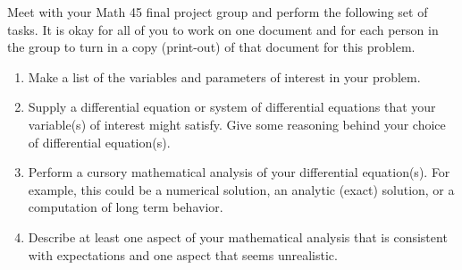 \documentclass[12pt,letterpaper]{hmcpset}
\begin{document}
\begin{problem}[3]
    Meet with your Math 45 final project group and perform the following set of tasks. It is okay for all of you to work on one document and for each person in the group to turn in a copy (print-out) of that document for this problem.
    \begin{enumerate}
        \item Make a list of the variables and parameters of interest in your problem.
        \item Supply a differential equation or system of differential equations that your variable(s) of interest might satisfy.  Give some reasoning behind your choice of differential equation(s).
        \item Perform a cursory mathematical analysis of your differential equation(s).  For example, this could be a numerical solution, an analytic (exact) solution, or a computation of long term behavior.
        \item Describe at least one aspect of your mathematical analysis that is consistent with expectations and one aspect that seems unrealistic.
    \end{enumerate}
\end{problem}

\begin{solution}
    \vfill
\end{solution}
\end{document}
